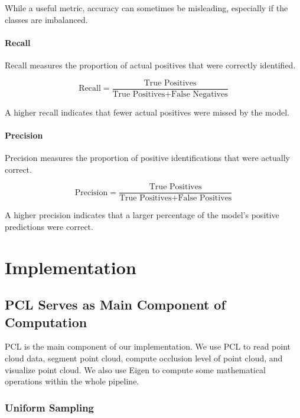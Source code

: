 \documentclass[11pt, a4paper,oneside,chapterprefix=false]{scrbook}
\begin{document}
While a useful metric, accuracy can sometimes be misleading, especially if the classes are imbalanced.

\subsubsection{Recall}

Recall measures the proportion of actual positives that were correctly identified.

\begin{equation}
	\text{Recall} = \frac{\text{True Positives}}{\text{True Positives} + \text{False Negatives}}
\end{equation}

A higher recall indicates that fewer actual positives were missed by the model.

\subsubsection{Precision}

Precision measures the proportion of positive identifications that were actually correct.

\begin{equation}
	\text{Precision} = \frac{\text{True Positives}}{\text{True Positives} + \text{False Positives}}
\end{equation}

A higher precision indicates that a larger percentage of the model's positive predictions were correct.

\chapter{Implementation} \label{chp:implementation}


\section{PCL Serves as Main Component of Computation} \label{sec:pcl and eigen}

PCL is the main component of our implementation. We use PCL to read point cloud data, segment point cloud, compute occlusion level of point cloud, and visualize point cloud. We also use Eigen to compute some mathematical operations within the whole pipeline.

\subsection{Uniform Sampling} \label{subsec:uniform sampling}
\end{document}
